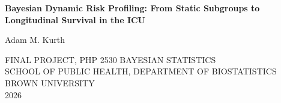 \begin{titlepage}
    \begin{center}
        \vspace*{2cm}

        \Large
        {\bf Bayesian Dynamic Risk Profiling: From Static Subgroups to Longitudinal Survival in the ICU}

        \vspace{4cm}

        \large
        Adam M. Kurth

        \vfill

        \normalsize
        FINAL PROJECT, PHP 2530 BAYESIAN STATISTICS\\
        SCHOOL OF PUBLIC HEALTH, DEPARTMENT OF BIOSTATISTICS\\
        BROWN UNIVERSITY\\[2cm]

        2026

    \end{center}
\end{titlepage}
